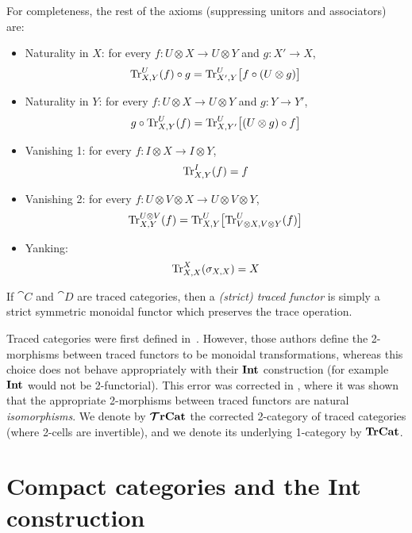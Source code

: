 \documentclass[11pt,oneside,article]{memoir}
\begin{document}
For completeness, the rest of the axioms (suppressing unitors and associators) are:
\begin{itemize}
   \item Naturality in $X$: for every $f\colon U\otimes X\to U\otimes Y$ and $g\colon X'\to X$,
      \begin{equation*}
         \operatorname{Tr}^U_{X,Y}(f)\circ g = \operatorname{Tr}^U_{X',Y}\bigl[f\circ(U\otimes g)\bigr]
      \end{equation*}
   \item Naturality in $Y$: for every $f\colon U\otimes X\to U\otimes Y$ and $g\colon Y\to Y'$,
      \begin{equation*}
         g\circ\operatorname{Tr}^U_{X,Y}(f) = \operatorname{Tr}^U_{X,Y'}\bigl[(U\otimes g)\circ f\bigr]
      \end{equation*}
   \item Vanishing 1: for every $f\colon I\otimes X\to I\otimes Y$,
      \begin{equation*}
         \operatorname{Tr}^I_{X,Y}(f) = f
      \end{equation*}
   \item Vanishing 2: for every $f\colon U\otimes V\otimes X\to U\otimes V\otimes Y$,
      \begin{equation*}
         \operatorname{Tr}^{U\otimes V}_{X,Y}(f) = \operatorname{Tr}^U_{X,Y}\bigl[\operatorname{Tr}^U_{V\otimes X,V\otimes Y}(f)\bigr]
      \end{equation*}
   \item Yanking:
      \begin{equation*}
         \operatorname{Tr}^X_{X,X}(\sigma_{X,X})=X
      \end{equation*}
\end{itemize}

If $\cat{C}$ and $\cat{D}$ are traced categories, then a \emph{(strict) traced functor} is simply a
strict symmetric monoidal functor which preserves the trace operation.

Traced categories were first defined in~\cite{JoyalStreetVerity}. However, those authors define the
2-morphisms between traced functors to be monoidal transformations, whereas this choice does not
behave appropriately with their $\mathbf{Int}$ construction (for example $\mathbf{Int}$ would not be 2-functorial).
This error was corrected in \cite{HK}, where it was shown that the appropriate 2-morphisms between
traced functors are natural \emph{isomorphisms}. We denote by $\bm{\mathcal{T}}\mathbf{rCat}$ the corrected 2-category of
traced categories (where 2-cells are invertible), and we denote its underlying 1-category by
$\mathbf{TrCat}$.

\section{Compact categories and the Int construction}\label{sec:compact_and_int}
\end{document}
